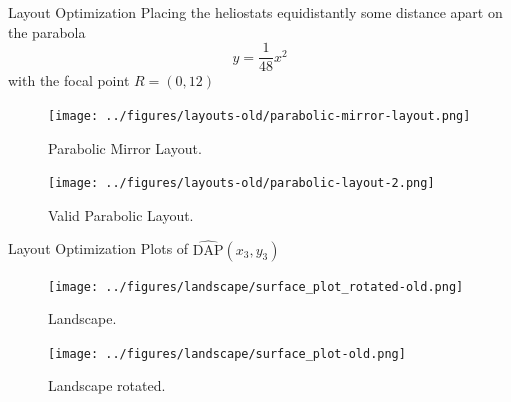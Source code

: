 \documentclass[10pt, xcolor={dvipsnames}]{beamer}
\begin{document}
\begin{frame}{Layout Optimization}
Placing the heliostats equidistantly some distance apart on the parabola
\begin{equation}
y = \frac{1}{48} x^{2}
\end{equation}
with the focal point $R = (0, 12)$
\begin{minipage}[t]{0.5\textwidth}
\begin{center}
\begin{figure}
\texttt{[image: ../figures/layouts-old/parabolic-mirror-layout.png]}
\caption{Parabolic Mirror Layout.}
\end{figure}
\end{center}
\end{minipage}%
\begin{minipage}[t]{0.5\textwidth}
\begin{center}
\begin{figure}
\texttt{[image: ../figures/layouts-old/parabolic-layout-2.png]}
\caption{Valid Parabolic Layout.}
\end{figure}
\end{center}
\end{minipage}
\end{frame}

\begin{frame}{Layout Optimization}
Plots of $\widehat{\text{DAP}}(x_3, y_3)$
\begin{minipage}[t]{0.5\textwidth}
\begin{center}
\begin{figure}
\texttt{[image: ../figures/landscape/surface\_plot\_rotated-old.png]}
\caption{Landscape.}
\end{figure}
\end{center}
\end{minipage}%
\begin{minipage}[t]{0.5\textwidth}
\begin{center}
\vspace{-.5cm}
\begin{figure}
\texttt{[image: ../figures/landscape/surface\_plot-old.png]}
\caption{Landscape rotated.}
\end{figure}
\end{center}
\end{minipage}
\end{frame}
\end{document}
